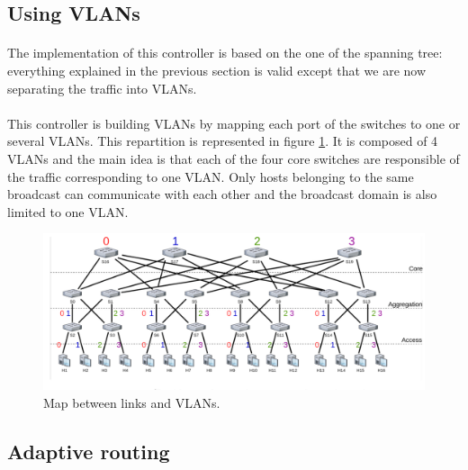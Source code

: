 \documentclass[a4paper, 11pt, oneside]{article}
\begin{document}
\subsection{Using VLANs}
\paragraph{}The implementation of this controller is based on the one of the spanning tree: everything explained in the previous section is valid except that we are now separating the traffic into VLANs.
\paragraph{}This controller is building VLANs by mapping each port of the switches to one or several VLANs. This repartition is represented in figure \ref{VLANs_rep}. It is composed of 4 VLANs and the main idea is that each of the four core switches are responsible of the traffic corresponding to one VLAN. 
Only hosts belonging to the same broadcast can communicate with each other and the broadcast domain is also limited to one VLAN.

\begin{figure}[H]
    \center
    \includegraphics[scale = 0.4]{VLANs/VLANs.png}
    \caption{Map between links and VLANs.}
    \label{VLANs_rep}
    \end{figure}

\subsection{Adaptive routing} \label{subsec:adaptive}
\end{document}
